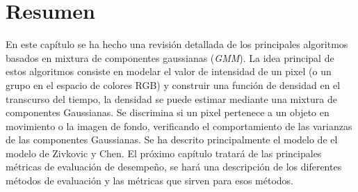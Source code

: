 \section{Resumen}

En este capítulo se ha hecho una revisión detallada de los principales algoritmos basados en mixtura de componentes gaussianas (\textit{GMM}). La idea principal de estos algoritmos consiste en modelar el valor de intensidad de un pixel (o un grupo en el espacio de colores RGB) y construir una función de densidad en el transcurso del tiempo, la densidad se puede estimar mediante una mixtura de componentes Gaussianas. Se discrimina si un pixel pertenece a un objeto en movimiento o la imagen de fondo, verificando el comportamiento de las varianzas de las componentes Gaussianas. Se ha descrito principalmente el modelo de el modelo de Zivkovic\cite{zivkovic_recursive_2004} y Chen\cite{chen_vehicle_2012}. El próximo capítulo tratará de las principales métricas de evaluación de desempeño, se hará una descripción de los diferentes métodos de evaluación y las métricas que sirven para esos métodos.